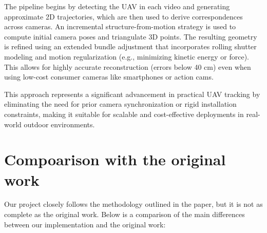 \documentclass[11pt]{article}
\begin{document}
The pipeline begins by detecting the UAV in each video and generating approximate 2D trajectories, which are then used to derive correspondences across cameras. An incremental structure-from-motion strategy is used to compute initial camera poses and triangulate 3D points. The resulting geometry is refined using an extended bundle adjustment that incorporates rolling shutter modeling and motion regularization (e.g., minimizing kinetic energy or force). This allows for highly accurate reconstruction (errors below 40 cm) even when using low-cost consumer cameras like smartphones or action cams.

This approach represents a significant advancement in practical UAV tracking by eliminating the need for prior camera synchronization or rigid installation constraints, making it suitable for scalable and cost-effective deployments in real-world outdoor environments.

\section{Compoarison with the original work}

Our project closely follows the methodology outlined in the paper, but it is not as complete as the original work. Below is a comparison of the main differences between our implementation and the original work:
\end{document}
